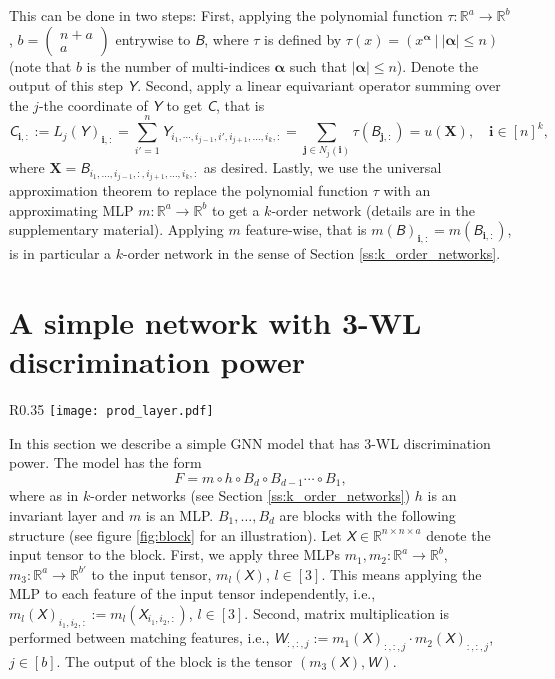 \documentclass{article}
\newcommand{\abs}[1]{\left\vert#1\right\vert}
\newcommand{\Real}{\mathbb R}
\newcommand{\too}{\rightarrow}
\newcommand{\ie}{{i.e.}}
\def\vi{{\bm{i}}}
\def\vj{{\bm{j}}}
\def\valpha{{\bm{\alpha}}}
\def\mX{{\bm{X}}}
\newcommand{\tens}[1]{\bm{\mathsfit{#1}}}
\def\tB{{\tens{B}}}
\def\tC{{\tens{C}}}
\def\tW{{\tens{W}}}
\def\tX{{\tens{X}}}
\def\tY{{\tens{Y}}}
\begin{document}
This can be done in two steps: First, applying the polynomial function $\tau:\Real^{a}\too \Real^b$, $b=\left(\begin{smallmatrix}n+a\\ a\end{smallmatrix}\right)$ entrywise to $\tB$, where $\tau$ is defined by $\tau(x)=(x^\valpha \ \vert \ \abs{\valpha}\leq n )$ (note that $b$ is the number of multi-indices $\valpha$ such that $\abs{\valpha}\leq n$). Denote the output of this step $\tY$. Second, apply a linear equivariant operator summing over the $j$-the coordinate of $\tY$ to get $\tC$, that is
$$\tC_{\vi,:} := L_j(\tY)_{\vi,:} = \sum_{i'=1}^n \tY_{i_1,\cdots,i_{j-1},i',i_{j+1},\ldots,i_k,:}=\sum_{\vj\in N_j(\vi)} \tau(\tB_{\vj,:})=u(\mX), \quad \vi\in [n]^k,$$  
where $\mX = \tB_{i_1,\ldots,i_{j-1},:,i_{j+1},\ldots,i_k,:}$ as desired. Lastly, we use the universal approximation theorem \citep{cybenko1989approximation,hornik1991approximation} to replace the polynomial function $\tau$ with an approximating MLP $m:\Real^{a}\too \Real^b$ to get a $k$-order network (details are in the supplementary material). Applying $m$ feature-wise, that is $m(\tB)_{\vi,:}= m(\tB_{\vi,:})$, is in particular a $k$-order network in the sense of Section \ref{ss:k_order_networks}.  

\section{A simple network with 3-WL discrimination  power}\label{s:3WL_network}

\begin{wrapfigure}[12]{R}{0.35\textwidth}
\vspace*{-8pt}\hspace{-5pt}
\texttt{[image: prod\_layer.pdf]}
\caption{Block structure.}\label{fig:block}
\end{wrapfigure}
In this section we describe a simple GNN model that has $3$-WL discrimination power. The model has the form 
\begin{equation}\label{e:qmlp}
 F=m\circ h \circ B_d \circ B_{d-1} \cdots \circ B_1,   
\end{equation}
where as in $k$-order networks (see Section \ref{ss:k_order_networks}) $h$ is an invariant layer and $m$ is an MLP. $B_1,\ldots,B_d$ are blocks with the following structure (see figure \ref{fig:block} for an illustration). Let $\tX\in\Real^{n\times n\times a}$ denote the input tensor to the block. First, we apply three MLPs $m_1,m_2:\Real^{a}\too \Real^{b}$, $m_3:\Real^{a}\too \Real^{b'}$ to the input tensor, $m_l(\tX)$, $l\in[3]$. This means applying the MLP to each feature of the input tensor independently, \ie, $m_l(\tX)_{i_1,i_2,:} := m_l(\tX_{i_1,i_2,:})$, $l\in [3]$. Second, matrix multiplication is performed between matching features, \ie, $\tW_{:,:,j} := m_1(\tX)_{:,:,j} \cdot m_2(\tX)_{:,:,j}$, $j\in [b]$. The output of the block is the tensor  $(m_3(\tX),\tW)$.  
\end{document}
